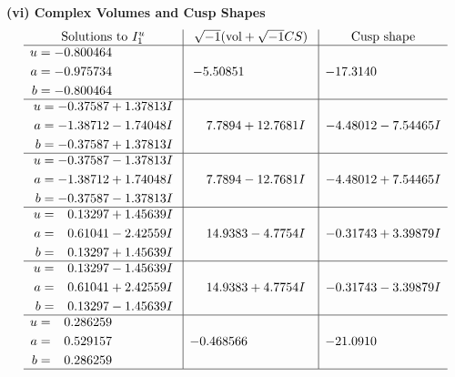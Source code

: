 \documentclass[1p]{elsarticle_modified}
\theoremstyle{definition}
\newcommand{\I}{\sqrt{-1}}
\begin{document}
\newpage\flushleft \textbf{(vi) Complex Volumes and Cusp Shapes}
$$\begin{array}{c|c|c}  
\text{Solutions to }I^u_{1}& \I (\text{vol} + \sqrt{-1}CS) & \text{Cusp shape}\\
 \hline 
\begin{aligned}
u &= -0.800464\phantom{ +0.000000I} \\
a &= -0.975734\phantom{ +0.000000I} \\
b &= -0.800464\phantom{ +0.000000I}\end{aligned}
 & -5.50851\phantom{ +0.000000I} & -17.3140\phantom{ +0.000000I} \\ \hline\begin{aligned}
u &= -0.37587 + 1.37813 I \\
a &= -1.38712 - 1.74048 I \\
b &= -0.37587 + 1.37813 I\end{aligned}
 & \phantom{-}7.7894 + 12.7681 I & -4.48012 - 7.54465 I \\ \hline\begin{aligned}
u &= -0.37587 - 1.37813 I \\
a &= -1.38712 + 1.74048 I \\
b &= -0.37587 - 1.37813 I\end{aligned}
 & \phantom{-}7.7894 - 12.7681 I & -4.48012 + 7.54465 I \\ \hline\begin{aligned}
u &= \phantom{-}0.13297 + 1.45639 I \\
a &= \phantom{-}0.61041 - 2.42559 I \\
b &= \phantom{-}0.13297 + 1.45639 I\end{aligned}
 & \phantom{-}14.9383 - 4.7754 I & -0.31743 + 3.39879 I \\ \hline\begin{aligned}
u &= \phantom{-}0.13297 - 1.45639 I \\
a &= \phantom{-}0.61041 + 2.42559 I \\
b &= \phantom{-}0.13297 - 1.45639 I\end{aligned}
 & \phantom{-}14.9383 + 4.7754 I & -0.31743 - 3.39879 I \\ \hline\begin{aligned}
u &= \phantom{-}0.286259\phantom{ +0.000000I} \\
a &= \phantom{-}0.529157\phantom{ +0.000000I} \\
b &= \phantom{-}0.286259\phantom{ +0.000000I}\end{aligned}
 & -0.468566\phantom{ +0.000000I} & -21.0910\phantom{ +0.000000I}\\
 \hline 
 \end{array}$$\newpage\newpage\renewcommand{\arraystretch}{1}
\end{document}
